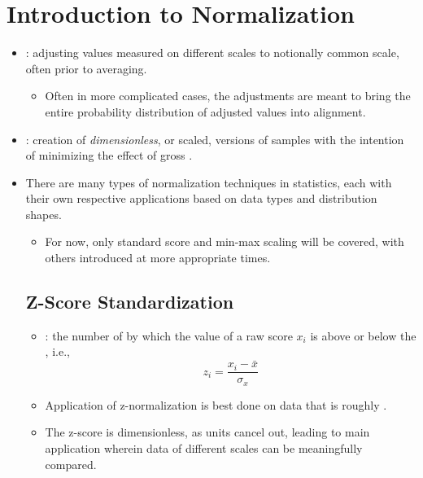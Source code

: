 \section{Introduction to Normalization}
\begin{itemize}
  \item {}: adjusting values measured on different scales to notionally common scale, often prior to averaging.
    \begin{itemize}
      \item Often in more complicated cases, the adjustments are meant to bring the entire probability distribution of adjusted values into alignment.
    \end{itemize}
  \item {}: creation of \emph{dimensionless}, or scaled, versions of samples with the intention of minimizing the effect of gross \hyperref[Subsection: Outliers]{}.
  \item There are many types of normalization techniques in statistics, each with their own respective applications based on data types and distribution shapes.
    \begin{itemize}
      \item For now, only standard score and min-max scaling will be covered, with others introduced at more appropriate times.
    \end{itemize}

  \subsection{Z-Score Standardization}
  \begin{itemize}
    \item {}: the number of \hyperref[Subsection: Measures of Dispersion]{} by which the value of a raw score \(x_i\) is above or below the \hyperref[Subsection: Measures of Central Tendency]{}, i.e., 
    \[%
    z_i = \frac{x_i - \bar{x}}{\sigma_x}
    \]%
    \item Application of z-normalization is best done on data that is roughly \hyperref[Subsection: Primer: Probability Distributions]{}. 
    \item The z-score is dimensionless, as units cancel out, leading to main application wherein data of different scales can be meaningfully compared. 
  \end{itemize}


\end{itemize}
